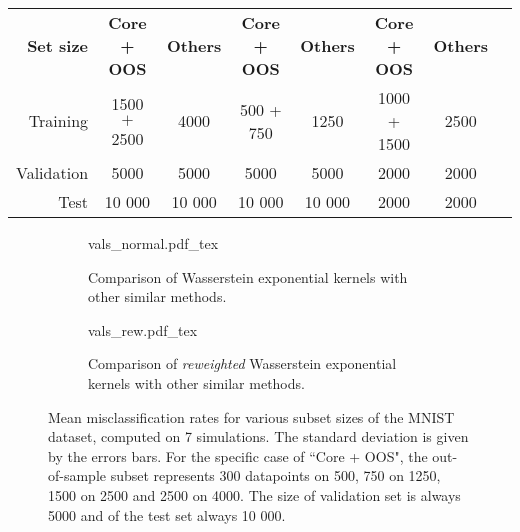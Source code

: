 \begin{table*}[h!]
{\begin{tabular}{r c c c c c c c}
      \cmidrule(lr){2-3}\cmidrule(lr){4-5}\cmidrule(lr){6-7}\\
      \textbf{Set size} &\textbf{Core + OOS} & \textbf{Others} & \textbf{Core + OOS} & \textbf{Others} & \textbf{Core + OOS} & \textbf{Others} \\
      Training & 1500 $+$ 2500 & 4000 & 500 + 750 & 1250 & 1000 + 1500 & 2500 \\
      Validation & 5000 & 5000 & 5000 & 5000 & 2000 & 2000 \\
      Test & 10 000 & 10 000 & 10 000 & 10 000 & 2000 & 2000
    \end{tabular}
   }
\end{table*}


\begin{figure}
    \centering
    \begin{subfigure}[t]{\textwidth}
        \centering 
        {\footnotesize
        \def\svgwidth{\linewidth}
        {vals_normal.pdf_tex}}
        \caption{Comparison of Wasserstein exponential kernels with other similar methods.}
    \end{subfigure}%
    \vfill
    \begin{subfigure}[t]{\textwidth}
        \centering 
        {\footnotesize
        \def\svgwidth{\linewidth}
        {vals_rew.pdf_tex}}
        \caption{Comparison of \emph{reweighted} Wasserstein exponential kernels with other similar methods.}
    \end{subfigure}%
    \caption[Misclassification errors of Wasserstein exponential kernels on MNIST.]{Mean misclassification rates for various subset sizes of the MNIST dataset, computed on 7 simulations. The standard deviation is given by the errors bars. For the specific case of ``Core + OOS", the out-of-sample subset represents 300 datapoints on 500, 750 on 1250, 1500 on 2500 and 2500 on 4000. The size of validation set is always 5000 and of the test set always 10 000.}
    \label{expe-shape}
\end{figure}

